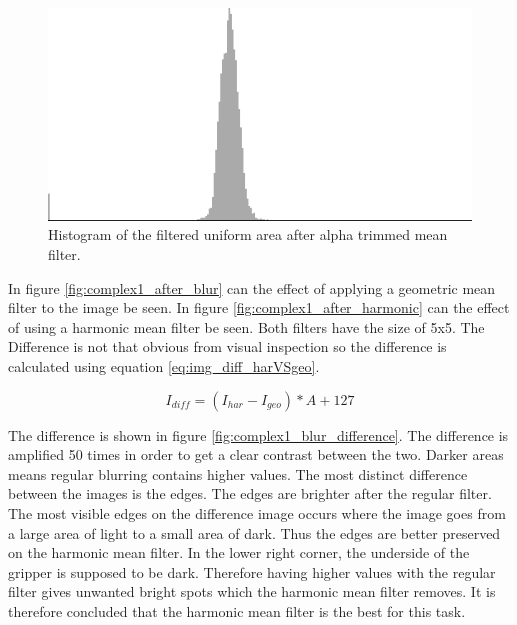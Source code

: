 \begin{figure}[H]
\centering
\includegraphics[width = \histogramWidth]{graphics/hist1_uniform2.png}
\caption{Histogram of the filtered uniform area after alpha trimmed mean filter.}
\label{fig:hist_img1_after_alpha}
\end{figure}

In figure \ref{fig:complex1_after_blur} can the effect of applying a geometric mean filter to the image be seen.
In figure \ref{fig:complex1_after_harmonic} can the effect of using a harmonic mean filter be seen.
Both filters have the size of 5x5. 
The Difference is not that obvious from visual inspection so the difference is calculated using equation \ref{eq:img_diff_harVSgeo}.

\begin{equation}
I_{diff} = \left( I_{har} - I_{geo} \right) * A + 127
\label{eq:img_diff_harVSgeo}
\end{equation}

The difference is shown in figure \ref{fig:complex1_blur_difference}.
The difference is amplified 50 times in order to get a clear contrast between the two.
Darker areas means regular blurring contains higher values.
The most distinct difference between the images is the edges. 
The edges are brighter after the regular filter. 
The most visible edges on the difference image occurs where the image goes from a large area of light to a small area of dark.
Thus the edges are better preserved on the harmonic mean filter.
In the lower right corner, the underside of the gripper is supposed to be dark.
Therefore having higher values with the regular filter gives unwanted bright spots which the harmonic mean filter removes.
It is therefore concluded that the harmonic mean filter is the best for this task.



